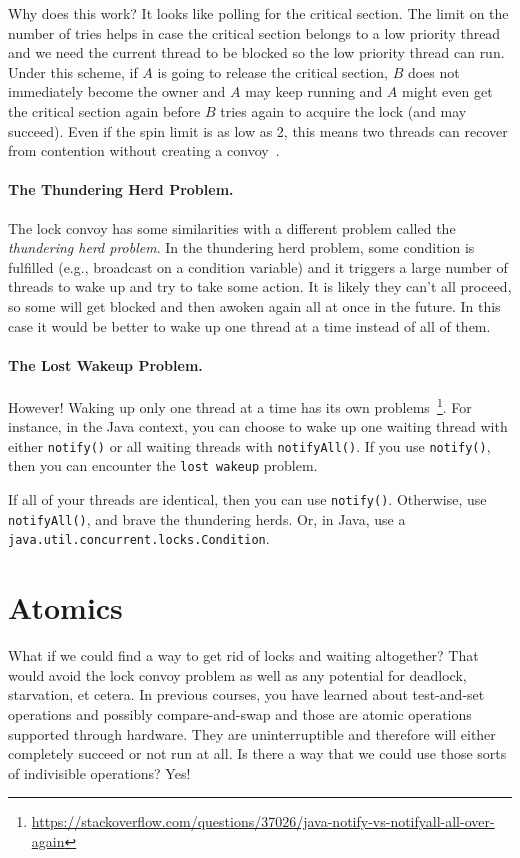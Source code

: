 \documentclass[a4paper]{report}
\begin{document}
Why does this work? It looks like polling for the critical section. The limit on the number of tries helps in case the critical section belongs to a low priority thread and we need the current thread to be blocked so the low priority thread can run. Under this scheme, if $A$ is going to release the critical section, $B$ does not immediately become the owner and $A$ may keep running and $A$ might even get the critical section again before $B$ tries again to acquire the lock (and may succeed). Even if the spin limit is as low as 2, this means two threads can recover from contention without creating a convoy~\cite{lockconvoys}. 

\paragraph{The Thundering Herd Problem.} The lock convoy has some similarities with a different problem called the \textit{thundering herd problem}. In the thundering herd problem, some condition is fulfilled (e.g., broadcast on a condition variable) and it triggers a large number of threads to wake up and try to take some action. It is likely they can't all proceed, so some will get blocked and then awoken again all at once in the future. In this case it would be better to wake up one thread at a time instead of all of them.

\paragraph{The Lost Wakeup Problem.} However! Waking up only one thread at a time has its own problems~\footnote{\url{https://stackoverflow.com/questions/37026/java-notify-vs-notifyall-all-over-again}}. For instance, in the Java context, you can choose to wake up one waiting thread with either \texttt{notify()} or all waiting threads with \texttt{notifyAll()}. If you use \texttt{notify()}, then you can encounter the \texttt{lost wakeup} problem.

If all of your threads are identical, then you can use \texttt{notify()}. Otherwise, use \texttt{notifyAll()}, and brave the thundering herds. Or, in Java, use a \texttt{java.util.concurrent.locks.Condition}.

\section*{Atomics}
What if we could find a way to get rid of locks and waiting altogether? That would avoid the lock convoy problem as well as any potential for deadlock, starvation, et cetera. In previous courses, you have learned about test-and-set operations and possibly compare-and-swap and those are atomic operations supported through hardware. They are uninterruptible and therefore will either completely succeed or not run at all. Is there a way that we could use those sorts of indivisible operations? Yes!
\end{document}
